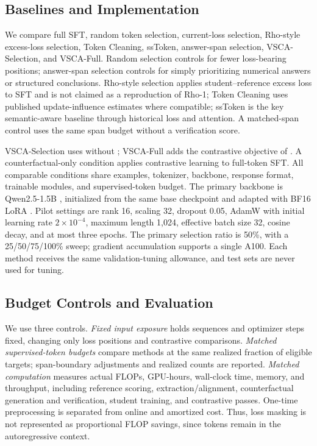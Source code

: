 \documentclass{article}
\newcommand{\vsca}{\textsc{VSCA}}
\begin{document}
\subsection{Baselines and Implementation}
\label{sec:baselines}
We compare full SFT, random token selection, current-loss selection, Rho-style excess-loss selection, Token Cleaning, ssToken, answer-span selection, \vsca-Selection, and \vsca-Full. Random selection controls for fewer loss-bearing positions; answer-span selection controls for simply prioritizing numerical answers or structured conclusions. Rho-style selection applies student--reference excess loss to SFT and is not claimed as a reproduction of Rho-1; Token Cleaning uses published update-influence estimates where compatible; ssToken is the key semantic-aware baseline through historical loss and attention. A matched-span control uses the same span budget without a verification score.

\vsca-Selection uses  without ; \vsca-Full adds the contrastive objective of . A counterfactual-only condition applies contrastive learning to full-token SFT. All comparable conditions share examples, tokenizer, backbone, response format, trainable modules, and supervised-token budget. The primary backbone is Qwen2.5-1.5B \citep{qwen25}, initialized from the same base checkpoint and adapted with BF16 LoRA \citep{lora}. Pilot settings are rank 16, scaling 32, dropout 0.05, AdamW with initial learning rate $2\times10^{-4}$, maximum length 1,024, effective batch size 32, cosine decay, and at most three epochs. The primary selection ratio is 50\%, with a 25/50/75/100\% sweep; gradient accumulation supports a single A100. Each method receives the same validation-tuning allowance, and test sets are never used for tuning.

\subsection{Budget Controls and Evaluation}
\label{sec:metrics}
We use three controls. \emph{Fixed input exposure} holds sequences and optimizer steps fixed, changing only loss positions and contrastive comparisons. \emph{Matched supervised-token budgets} compare methods at the same realized fraction of eligible targets; span-boundary adjustments and realized counts are reported. \emph{Matched computation} measures actual FLOPs, GPU-hours, wall-clock time, memory, and throughput, including reference scoring, extraction/alignment, counterfactual generation and verification, student training, and contrastive passes. One-time preprocessing is separated from online and amortized cost. Thus, loss masking is not represented as proportional FLOP savings, since tokens remain in the autoregressive context.
\end{document}
